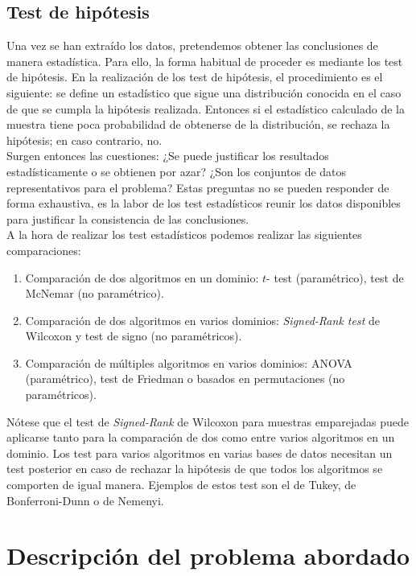 \subsection*{Test de hipótesis}

	Una vez se han extraído los datos, pretendemos obtener
las conclusiones de manera estadística. Para ello, la 
forma habitual de proceder es mediante los test de hipótesis.
En la realización de los test de hipótesis, el 
procedimiento es el siguiente: se define un estadístico que 
sigue una distribución conocida en el caso de que se cumpla 
la hipótesis realizada. Entonces si el estadístico calculado 
de la muestra tiene poca probabilidad de obtenerse de la 
distribución, se rechaza la hipótesis; en caso contrario, no. 
\\
	Surgen entonces las cuestiones: ¿Se puede justificar los 
resultados estadísticamente o se obtienen por azar? ¿Son los 
conjuntos de datos representativos para el problema? Estas 
preguntas no se pueden responder de forma exhaustiva, es la 
labor de los test estadísticos reunir los datos disponibles 
para justificar la consistencia de las conclusiones. \\
	A la hora de realizar los test estadísticos podemos 
realizar las siguientes comparaciones:
	\begin{enumerate}
	\item Comparación de dos algoritmos en un dominio: $t$-
		test (paramétrico), test de McNemar (no paramétrico).
	\item Comparación de dos algoritmos en varios dominios: 
		\textit{Signed-Rank test} de Wilcoxon y test de signo 
		(no paramétricos).
	\item Comparación de múltiples algoritmos en varios 
		dominios: ANOVA (paramétrico), test de Friedman o 
		basados en permutaciones (no paramétricos). 
	\end{enumerate}

	Nótese que el test de \textit{Signed-Rank} de Wilcoxon 
para muestras emparejadas puede aplicarse tanto para la 
comparación de dos como entre varios algoritmos en un 
dominio. Los test para varios algoritmos en varias bases de 
datos necesitan un test posterior en caso de rechazar la 
hipótesis de que todos los algoritmos se comporten de igual 
manera. Ejemplos de estos test son el de Tukey, de 
Bonferroni-Dunn o de Nemenyi.

\section*{Descripción del problema abordado}

